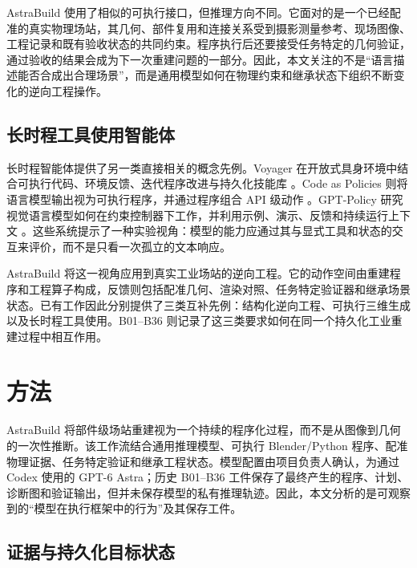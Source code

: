 \documentclass[10pt,a4paper]{article}
\begin{document}
AstraBuild
使用了相似的可执行接口，但推理方向不同。它面对的是一个已经配准的真实物理场站，其几何、部件复用和连接关系受到摄影测量参考、现场图像、工程记录和既有验收状态的共同约束。程序执行后还要接受任务特定的几何验证，通过验收的结果会成为下一次重建问题的一部分。因此，本文关注的不是``语言描述能否合成出合理场景''，而是通用模型如何在物理约束和继承状态下组织不断变化的逆向工程操作。

\hypertarget{ux957fux65f6ux7a0bux5de5ux5177ux4f7fux7528ux667aux80fdux4f53}{%
\subsection{长时程工具使用智能体}\label{ux957fux65f6ux7a0bux5de5ux5177ux4f7fux7528ux667aux80fdux4f53}}

长时程智能体提供了另一类直接相关的概念先例。Voyager
在开放式具身环境中结合可执行代码、环境反馈、迭代程序改进与持久化技能库
\citep{wang2023voyager}。Code as Policies
则将语言模型输出视为可执行程序，并通过程序组合 API 级动作
\citep{liang2023code}。GPT-Policy
研究视觉语言模型如何在约束控制器下工作，并利用示例、演示、反馈和持续运行上下文
\citep{cheng2026gptpolicy}。这些系统提示了一种实验视角：模型的能力应通过其与显式工具和状态的交互来评价，而不是只看一次孤立的文本响应。

AstraBuild
将这一视角应用到真实工业场站的逆向工程。它的动作空间由重建程序和工程算子构成，反馈则包括配准几何、渲染对照、任务特定验证器和继承场景状态。已有工作因此分别提供了三类互补先例：结构化逆向工程、可执行三维生成以及长时程工具使用。B01--B36
则记录了这三类要求如何在同一个持久化工业重建过程中相互作用。

\hypertarget{ux65b9ux6cd5}{%
\section{方法}\label{ux65b9ux6cd5}}

AstraBuild
将部件级场站重建视为一个持续的程序化过程，而不是从图像到几何的一次性推断。该工作流结合通用推理模型、可执行
Blender/Python
程序、配准物理证据、任务特定验证和继承工程状态。模型配置由项目负责人确认，为通过
Codex 使用的 GPT-6 Astra；历史 B01--B36
工件保存了最终产生的程序、计划、诊断图和验证输出，但并未保存模型的私有推理轨迹。因此，本文分析的是可观察到的``模型在执行框架中的行为''及其保存工件。

\hypertarget{ux8bc1ux636eux4e0eux6301ux4e45ux5316ux76eeux6807ux72b6ux6001}{%
\subsection{证据与持久化目标状态}\label{ux8bc1ux636eux4e0eux6301ux4e45ux5316ux76eeux6807ux72b6ux6001}}
\end{document}
